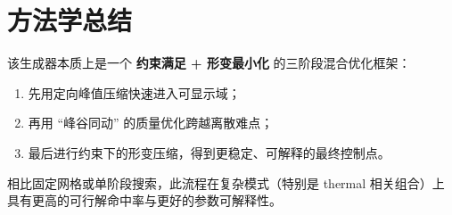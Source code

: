 \documentclass[UTF8,fontset=fandol]{ctexart}
\begin{document}
\section{方法学总结}
该生成器本质上是一个 \textbf{约束满足 + 形变最小化} 的三阶段混合优化框架：
\begin{enumerate}
    \item 先用定向峰值压缩快速进入可显示域；
    \item 再用 ``峰谷同动'' 的质量优化跨越离散难点；
    \item 最后进行约束下的形变压缩，得到更稳定、可解释的最终控制点。
\end{enumerate}
相比固定网格或单阶段搜索，此流程在复杂模式（特别是 thermal 相关组合）上具有更高的可行解命中率与更好的参数可解释性。
\end{document}
